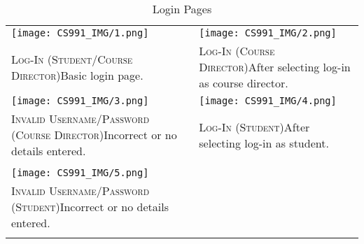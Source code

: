 \documentclass[11pt, english]{article}
\begin{document}
	\begin{center}
                \scriptsize
        \begin{longtable}{p{7cm}p{7cm}}
		\texttt{[image: CS991\_IMG/1.png]} & \texttt{[image: CS991\_IMG/2.png]}\\
		\textsc{Log-In (Student/Course Director)}\newline Basic login page. & \textsc{Log-In (Course Director)}\newline After selecting log-in as course director.\\
		\texttt{[image: CS991\_IMG/3.png]} & \texttt{[image: CS991\_IMG/4.png]}\\
		\textsc{Invalid Username/Password (Course Director)}\newline Incorrect or no details entered. & \textsc{Log-In (Student)}\newline After selecting log-in as student.\\
		& \\
		\texttt{[image: CS991\_IMG/5.png]} & \\
		\textsc{Invalid Username/Password (Student)}\newline Incorrect or no details entered. & \\ 
                \caption{Login Pages}
        \end{longtable}
        \end{center}
\end{document}
